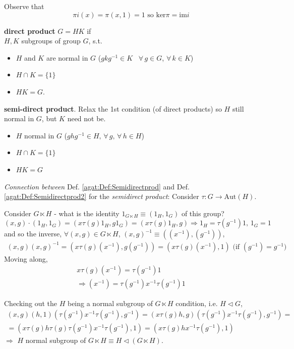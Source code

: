 \begin{itemize}
Observe that 
\[
\pi i(x) = \pi(x,1)=1 \text{ so } \text{ker}\pi = \text{im}i
\]

\begin{definition}\label{agat:Def:Semidirectprod2}
	\textbf{direct product} $G=HK$ if \\
$H,K$ subgroups of group $G$, s.t. \\
\begin{itemize}
\item $H$ and $K$ are normal in $G$ ($gkg^{-1} \in K$ \, $\forall \, g\in G$, $\forall \, k \in K$)  
\item $H\cap K = \lbrace 1 \rbrace$  
\item $HK=G$.  
\end{itemize} 

\textbf{semi-direct product}.  Relax the 1st condition (of direct products) so $H$ still normal in $G$, but $K$ need not be.  \\
\begin{itemize}
\item $H$ normal in $G$ ($ghg^{-1} \in H, \, \forall \, g , \, \forall \, h \in H$)  
\item $H\cap K = \lbrace 1 \rbrace$ 
\item $HK = G$
\end{itemize}
\end{definition}

\emph{Connection between} Def. \ref{agat:Def:Semidirectprod} and Def. \ref{agat:Def:Semidirectprod2} for the \emph{semidirect product}:  Consider $\tau : G \to \text{Aut}(H)$.  

Consider $G \ltimes H$ - what is the identity $1_{G\ltimes H} \equiv (1_H,1_G)$ of this group?  
\[
(x,g)\cdot (1_H,1_G) = (x\tau(g) 1_H, g1_G) = (x\tau(g)1_H, g) \Longrightarrow 1_H = \tau(g^{-1})1, \, 1_G=1
\]
and so the inverse, $\forall (x,g) \in G\ltimes H$, $(x,g)^{-1} \equiv ((x^{-1}), (g^{-1}))$, 
\[
\begin{gathered}
	(x,g) (x,g)^{-1} = (x\tau(g) (x^{-1}),g(g^{-1}) ) = (x\tau(g)(x^{-1}), 1) \text{ (if $(g^{-1}) = g^{-1}$) }
\end{gathered}
\]
Moving along, 
\[
\begin{gathered}
	x\tau(g) (x^{-1}) = \tau(g^{-1})1 \\
\Longrightarrow (x^{-1}) = \tau(g^{-1}) x^{-1}\tau(g^{-1})1
\end{gathered}
\]

Checking out the $H$ being a normal subgroup of $G\ltimes H$ condition, i.e. $H \lhd G$, 
\[
\begin{gathered}
	(x,g)(h,1)(\tau(g^{-1})x^{-1} \tau(g^{-1}) , g^{-1}) = (x\tau(g)h, g)(\tau(g^{-1})x^{-1}\tau(g^{-1}) , g^{-1}) = \\
= (x\tau(g)h \tau(g)\tau(g^{-1}) x^{-1}\tau(g^{-1}), 1) = (x\tau(g) hx^{-1}\tau(g^{-1}), 1) 
\end{gathered}
\]
$\Longrightarrow$ $H$ normal subgroup of $G\ltimes H \equiv H \lhd (G\ltimes H)$.  


\end{itemize}
